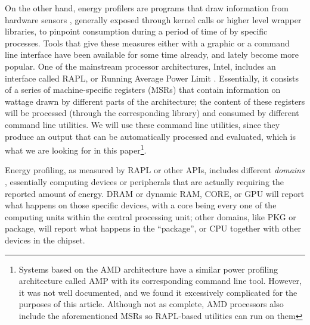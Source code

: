 \documentclass[a4paper,twoside]{article}
\begin{document}
On the other hand, energy profilers are programs that draw information from
hardware sensors \cite{sinha2001jouletrack}, generally exposed through kernel
calls or higher level wrapper libraries, to pinpoint consumption during a period
of time of by specific processes. Tools that give these measures either with a
graphic or a command line interface have been available for some time already,
and lately become more popular. One of the mainstream processor architectures,
Intel, includes an interface called RAPL, or Running Average Power Limit
\cite{rapl}. Essentially, it consists of a series of machine-specific registers
(MSRs) that contain information on wattage drawn by different parts of the
architecture; the content of these registers will be processed (through the
corresponding library) and consumed by different command line utilities. We will
use these command line utilities, since they produce an output that can be
automatically processed and evaluated, which is what we are looking for in this
paper\footnote{Systems based on the AMD architecture have a similar power
  profiling architecture called AMP with its corresponding command line
  tool. However, it was not well documented, and we found it excessively
  complicated for the purposes of this article. Although not as complete, AMD
  processors also include the aforementioned MSRs so RAPL-based utilities can
  run on them}.

Energy profiling, as measured by RAPL or other APIs, includes different
\emph{domains} \cite{khan2015energy}, essentially computing devices or
peripherals that are actually requiring the reported amount of energy. DRAM or
dynamic RAM, CORE, or GPU will report what happens on those specific devices,
with a core being every one of the computing units within the central processing
unit; other domains, like PKG or package, will report what happens in the
``package'', or CPU together with other devices in the chipset.
\end{document}
